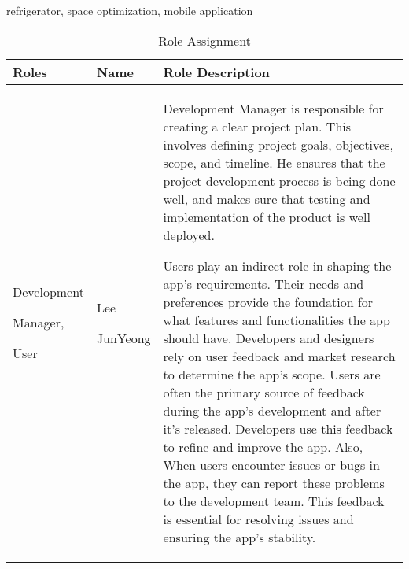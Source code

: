 \documentclass[conference]{IEEEtran}
\begin{document}
\begin{IEEEkeywords}
refrigerator, space optimization, mobile application
\end{IEEEkeywords}

\begin{table}[ht]
\caption{Role Assignment}
\begin{tabular}{| p{1.3cm}|p{1cm}|p{5.5cm} |}

\hline
Roles & Name & Role Description\\
\hline
Development \par Manager, \par User 
& Lee \par JunYeong 
& Development Manager is responsible for creating a clear project plan. This involves defining project goals, objectives, scope, and timeline. He ensures that the project development process is being done well, and makes sure that testing and implementation of the product is well deployed. \par
Users play an indirect role in shaping the app's requirements. Their needs and preferences provide the foundation for what features and functionalities the app should have. Developers and designers rely on user feedback and market research to determine the app's scope. Users are often the primary source of feedback during the app's development and after it's released. Developers use this feedback to refine and improve the app. Also, When users encounter issues or bugs in the app, they can report these problems to the development team. This feedback is essential for resolving issues and ensuring the app's stability.\\
\hline
\end{tabular}
\end{table}
\end{document}
